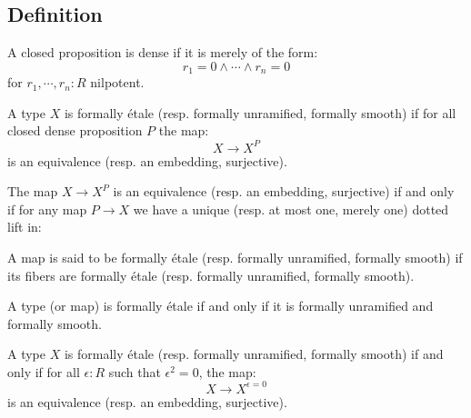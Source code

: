 \subsection{Definition}

\begin{definition}
A closed proposition is dense if it is merely of the form:
\[r_1=0\land\cdots\land r_n=0\]
for $r_1,\cdots,r_n:R$ nilpotent.
\end{definition}

\begin{definition}
  \label{def-etale-closed-dense}
A type $X$ is formally étale (resp. formally unramified, formally smooth) if for all closed dense proposition $P$ the map:
\[X\to X^P\]
is an equivalence (resp. an embedding, surjective).
\end{definition}

\begin{remark}
The map $X\to X^P$ is an equivalence (resp. an embedding, surjective) if and only if for any map $P\to X$ we have a unique (resp. at most one, merely one) dotted lift in:
\begin{center}
\end{center}
\end{remark}

\begin{definition}
A map is said to be formally étale (resp. formally unramified, formally smooth) if its fibers are formally étale (resp. formally unramified, formally smooth).
\end{definition}

\begin{remark}
A type (or map) is formally étale if and only if it is formally unramified and formally smooth.
\end{remark}

\begin{lemma}
A type $X$ is formally étale (resp. formally unramified, formally smooth) if and only if for all $\epsilon:R$ such that $\epsilon^2=0$, the map:
\[X\to X^{\epsilon=0}\]
is an equivalence (resp. an embedding, surjective).
\end{lemma}

